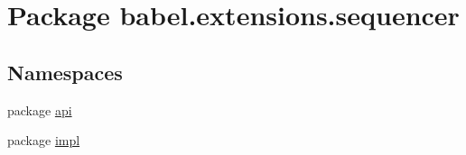 \hypertarget{namespacebabel_1_1extensions_1_1sequencer}{\section{Package babel.\-extensions.\-sequencer}
\label{namespacebabel_1_1extensions_1_1sequencer}
}
\subsection*{Namespaces}
\begin{DoxyCompactItemize}
\item 
package \hyperlink{namespacebabel_1_1extensions_1_1sequencer_1_1api}{api}
\item 
package \hyperlink{namespacebabel_1_1extensions_1_1sequencer_1_1impl}{impl}
\end{DoxyCompactItemize}
